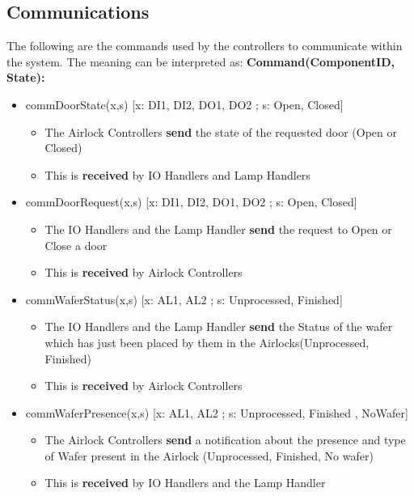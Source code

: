 \documentclass[a4paper,12pt]{article}
\begin{document}
\subsection {Communications}
The following are the commands used by the controllers to communicate within the system. The meaning can be interpreted as: 
\bigskip
\newline 
\textbf{Command(ComponentID, State):}
\begin{itemize}
\item commDoorState(x,s) [x: DI1, DI2, DO1, DO2 ; s: Open, Closed] 
\begin{itemize}
    \item The Airlock Controllers \textbf{send} the state of the requested door (Open or Closed)
    \item This is \textbf{received} by IO Handlers and Lamp Handlers
\end{itemize}
\bigskip

\item commDoorRequest(x,s) [x: DI1, DI2, DO1, DO2 ; s: Open, Closed]
\begin{itemize}
    \item The IO Handlers and the Lamp Handler \textbf{send} the request to Open or Close a door 
    \item This is \textbf{received} by Airlock Controllers
\end{itemize}
\bigskip

\item commWaferStatus(x,s) [x: AL1, AL2 ; s: Unprocessed, Finished]
\begin{itemize}
    \item The IO Handlers and the Lamp Handler \textbf{send} the Status of the wafer which has just been placed by them in the Airlocks(Unprocessed, Finished) 
    \item This is \textbf{received} by Airlock Controllers
\end{itemize}
\bigskip

\item commWaferPresence(x,s) [x: AL1, AL2 ; s: Unprocessed, Finished , NoWafer]
\begin{itemize}
    \item The Airlock Controllers \textbf{send} a notification about the presence and type of Wafer present in the Airlock (Unprocessed, Finished, No wafer) 
    \item This is \textbf{received} by IO Handlers and the Lamp Handler
\end{itemize}
\end{itemize}
\newpage
\end{document}
